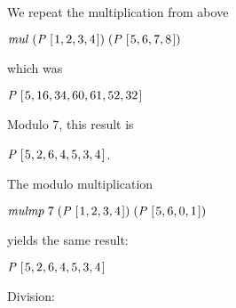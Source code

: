 \documentclass[tikz]{scrreprt}
\newcommand{\Conid}[1]{\mathit{#1}}
\newcommand{\Varid}[1]{\mathit{#1}}
\begin{document}
We repeat the multiplication from above 

\ensuremath{\Varid{mul}\;(\Conid{P}\;[\mskip1.5mu \mathrm{1},\mathrm{2},\mathrm{3},\mathrm{4}\mskip1.5mu])\;(\Conid{P}\;[\mskip1.5mu \mathrm{5},\mathrm{6},\mathrm{7},\mathrm{8}\mskip1.5mu])} 

which was

\ensuremath{\Conid{P}\;[\mskip1.5mu \mathrm{5},\mathrm{16},\mathrm{34},\mathrm{60},\mathrm{61},\mathrm{52},\mathrm{32}\mskip1.5mu]}

Modulo 7, this result is

\ensuremath{\Conid{P}\;[\mskip1.5mu \mathrm{5},\mathrm{2},\mathrm{6},\mathrm{4},\mathrm{5},\mathrm{3},\mathrm{4}\mskip1.5mu]}.

The modulo multiplication

\ensuremath{\Varid{mulmp}\;\mathrm{7}\;(\Conid{P}\;[\mskip1.5mu \mathrm{1},\mathrm{2},\mathrm{3},\mathrm{4}\mskip1.5mu])\;(\Conid{P}\;[\mskip1.5mu \mathrm{5},\mathrm{6},\mathrm{0},\mathrm{1}\mskip1.5mu])}

yields the same result:

\ensuremath{\Conid{P}\;[\mskip1.5mu \mathrm{5},\mathrm{2},\mathrm{6},\mathrm{4},\mathrm{5},\mathrm{3},\mathrm{4}\mskip1.5mu]}

Division:
\end{document}
